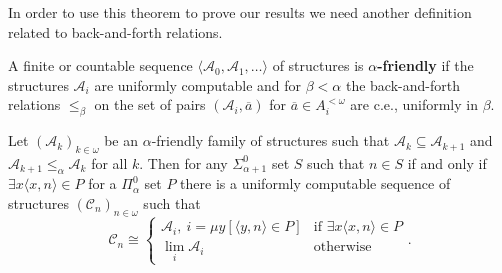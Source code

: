 \documentclass[10pt,a4paper]{amsart}
\newcommand\+[1]{\mathcal{#1}}
\renewcommand\*[1]{\mathbf{#1}}
\renewcommand\=[1]{\text{#1}}
\renewcommand\*[1]{\mathbf{#1}}
\newcommand{\A}{\mathcal{A}}
\newcommand{\ol}[1]{\overline{#1}}
\newcommand{\mc}[1]{\mathcal{#1}}
\newcommand{\define}[1]{\textbf{#1}}
\begin{document}
In order to use this theorem to prove our results we need another definition related to back-and-forth relations.
\begin{definition}\label{def:alphafriendly}
A finite or countable sequence $\langle \A_0,\A_1,\dots \rangle$ of structures is \define{$\alpha$-friendly} if the structures $\A_i$ are uniformly computable and for $\beta<\alpha$ the back-and-forth relations $\leq_\beta$ on the set of pairs $(\A_i, \ol a)$ for $\ol a\in A_i^{<\omega}$ are c.e., uniformly in $\beta$.
\end{definition}



\begin{lemma}\label{thm:alphalimit}
Let $( \mc A_k )_{k\in \omega}$ be an $\alpha$-friendly family of structures such that $\mc A_k\subseteq \mc A_{k+1}$ and $\mc A_{k+1}\leq_{\alpha} \mc A_k$ for all $k$. Then for any $\Sigma_{\alpha+1}^0$ set $S$ such that $n\in S$ if and only if $\exists x \langle x,n\rangle \in P$ for a $\Pi_{\alpha}^0$ set $P$ there is a uniformly computable sequence of structures $(\mc C_n)_{n\in \omega}$ such that
\[ \mc C_n \cong \begin{cases} \mc A_i,\ i =\mu y[\langle y,n\rangle \in P] & \text{if } \exists x \langle x,n\rangle \in P\\
\lim_i \mc A_i & \text{otherwise}
\end{cases}.\]
\end{lemma}
\end{document}
